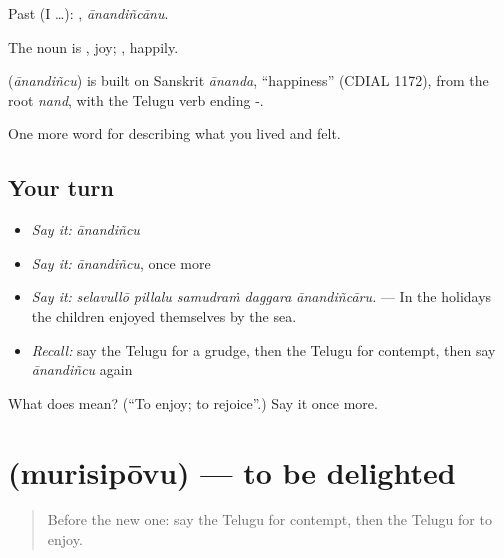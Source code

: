 Past (I …): , \emph{ānandiñcānu}.

The noun is , joy; , happily.

\begin{cousinweb}
\textbf{} (\emph{ānandiñcu}) is built on Sanskrit \emph{ānanda}, \textquotedblleft{}happiness\textquotedblright{} (CDIAL 1172), from the root \emph{nand}, with the Telugu verb ending -.
\end{cousinweb}

\begin{grammarlens}[title={What you've built}]
One more word for describing what you lived and felt.
\end{grammarlens}

\subsection*{Your turn}
\begin{itemize}
\raggedright
  \item \emph{Say it:} \emph{ānandiñcu}
  \item \emph{Say it:} \emph{ānandiñcu}, once more
  \item \emph{Say it:} \emph{selavullō pillalu samudraṁ daggara ānandiñcāru.} — In the holidays the children enjoyed themselves by the sea.
  \item \emph{Recall:} say the Telugu for a grudge, then the Telugu for contempt, then say \emph{ānandiñcu} again
\end{itemize}

\begin{tcolorbox}[breakable,colback=teal!4,colframe=teal!35!black,title={Before you move on}]
What does  mean? (\textquotedblleft{}To enjoy; to rejoice\textquotedblright{}.) Say it once more.
\end{tcolorbox}
\section[\texorpdfstring{\te{మురిసిపోవు} (murisipōvu)}{మురిసిపోవు (murisipōvu)}]{ (murisipōvu) — to be delighted}

\label{lesson:TE-C500-murisipovu}



\begin{quote}
Before the new one: say the Telugu for contempt, then the Telugu for to enjoy.
\end{quote}

